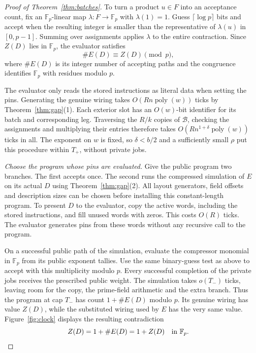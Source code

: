\begin{proof}[Proof of Theorem~\ref{thm:batches}]
To turn a product $u\in F$ into an acceptance count, fix an
$\mathbb F_p$-linear map $\lambda:F\to\mathbb F_p$ with $\lambda(1)=1$.
Guess $\lceil\log p\rceil$ bits and accept when the resulting integer
is smaller than the representative of $\lambda(u)$ in $[0,p-1]$.
Summing over assignments applies $\lambda$ to the entire contraction.
Since $Z(D)$ lies in $\mathbb F_p$, the evaluator satisfies
\[
                    \#E(D)\equiv Z(D)\pmod p ,
\]
where $\#E(D)$ is its integer number of accepting paths and the
congruence identifies $\mathbb F_p$ with residues modulo $p$.

The evaluator only reads the stored instructions as literal data
when setting the pins. Generating the genuine wiring takes
$O(Rn\operatorname{poly}(w))$ ticks by Theorem~\ref{thm:gap}(1).
Each exterior slot has an $O(w)$-bit identifier for its batch and
corresponding leg. Traversing the $R/k$ copies of $\mathcal B$,
checking the assignments and multiplying their entries therefore takes
$O(Rn^{1+\delta}\operatorname{poly}(w))$ ticks in all. The exponent
on $w$ is fixed, so $\delta<b/2$ and a sufficiently small $\rho$ put
this procedure within $T_+$, without private jobs.

\smallskip
\noindent\emph{Choose the program whose pins are evaluated.}
Give the public program two branches. The first accepts once.
The second runs the compressed simulation of $E$ on its actual $D$
using Theorem~\ref{thm:gap}(2). All layout generators, field offsets
and description sizes can be chosen before installing this
constant-length program. To present $D$ to the evaluator, copy the
active words, including the stored instructions, and fill unused
words with zeros. This costs $O(R)$ ticks. The evaluator generates
pins from these words without any recursive call to the program.

On a successful public path of the simulation, evaluate the
compressor monomial in $\mathbb F_p$ from its public exponent tallies.
Use the same binary-guess test as above to accept with this
multiplicity modulo $p$. Every successful completion of the private
jobs receives the prescribed public weight. The simulation takes
$o(T_-)$ ticks, leaving room for the copy, the prime-field arithmetic
and the extra branch. Thus the program at cap $T_-$ has count
$1+\#E(D)$ modulo $p$. Its genuine wiring has value $Z(D)$, while
the substituted wiring used by $E$ has the very same value.
Figure~\ref{fig:clock} displays the resulting contradiction
\[
                Z(D)=1+\#E(D)=1+Z(D)\quad\text{in }\mathbb F_p .\qedhere
\]
\end{proof}


